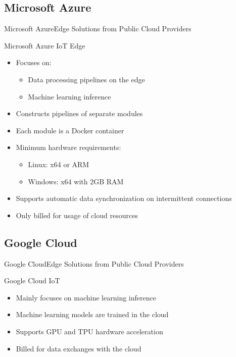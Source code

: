 \documentclass[10pt,xcolor={dvipsnames}]{beamer}
\renewcommand{\logofile}{example-grid-100x100pt}
\renewcommand{\logoscale}{0.0}
\begin{document}
\subsection{Microsoft Azure}
\renewcommand{\logofile}{img/azure}
\renewcommand{\logoscale}{0.9}
\begin{frame}{Microsoft Azure}{Edge Solutions from Public Cloud Providers}

\begin{block}{Microsoft Azure IoT Edge}
  \begin{itemize}
    \item Focuses on:
    \begin{itemize}
        \item Data processing pipelines on the edge
        \item Machine learning inference
    \end{itemize}
    \item Constructs pipelines of separate modules
    \item Each module is a Docker container
    \item Minimum hardware requirements:
    \begin{itemize}
        \item Linux: x64 or ARM
        \item Windows: x64 with 2GB RAM
    \end{itemize}
    \item Supports automatic data synchronization on intermittent connections
    \item Only billed for usage of cloud resources
  \end{itemize}
\end{block}
\end{frame}

\subsection{Google Cloud}
\renewcommand{\logofile}{img/gcp}
\renewcommand{\logoscale}{0.7}
\begin{frame}{Google Cloud}{Edge Solutions from Public Cloud Providers}

\begin{block}{Google Cloud IoT}
  \begin{itemize}
    \item Mainly focuses on machine learning inference
    \item Machine learning models are trained in the cloud
    \item Supports GPU and TPU hardware acceleration
    \item Billed for data exchanges with the cloud
  \end{itemize}
\end{block}
\end{frame}
     
\end{document}
